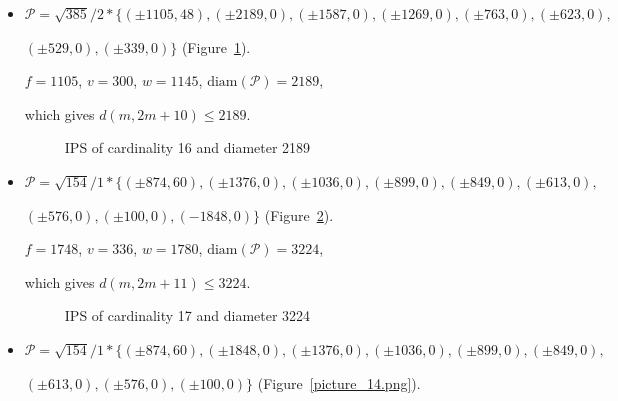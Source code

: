 \documentclass[12pt]{article}
\theoremstyle{theorem}
\theoremstyle{dfn}
\theoremstyle{remark}
\begin{document}
\begin{itemize}
\item
$\mathcal{P}=\sqrt{385}/{2} * \{ (\pm 1105, 48),
(\pm 2189 , 0),
(\pm 1587 , 0),
(\pm 1269 , 0),
(\pm 763 , 0),
(\pm 623 , 0),
$

$
(\pm 529 , 0),
(\pm 339 , 0)\}
$
(Figure~\ref{picture_9.png}).

$f = 1105$, $v = 300$, $w = 1145$, $\operatorname{diam(\mathcal{P})} = 2189$,

which gives $d(m, 2m + 10) \leq 2189$.


\begin{figure}[h!]
\parbox{0.75\linewidth}{\caption{IPS of cardinality 16 and diameter 2189}
\label{picture_9.png}}
\end{figure}


\item
$\mathcal{P}=\sqrt{154}/{1} * \{ (\pm 874, 60),
(\pm 1376 , 0),
(\pm 1036 , 0),
(\pm 899 , 0),
(\pm 849 , 0),
(\pm 613 , 0),
$

$
(\pm 576 , 0),
(\pm 100 , 0),
(-1848 , 0)\}
$
(Figure~\ref{picture_13.png}).

$f = 1748$, $v = 336$, $w = 1780$, $\operatorname{diam(\mathcal{P})} = 3224$,

which gives $d(m, 2m + 11) \leq 3224$.


\begin{figure}[h!]
\parbox{0.85\linewidth}{\caption{IPS of cardinality 17 and diameter 3224}
\label{picture_13.png}}
\end{figure}


\item
$\mathcal{P}=\sqrt{154}/{1} * \{ (\pm 874, 60),
(\pm 1848 , 0),
(\pm 1376 , 0),
(\pm 1036 , 0),
(\pm 899 , 0),
(\pm 849 , 0),
$

$
(\pm 613 , 0),
(\pm 576 , 0),
(\pm 100 , 0)\}
$
(Figure~\ref{picture_14.png}).


\end{itemize}
\end{document}
